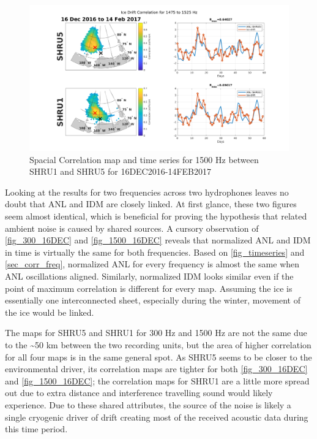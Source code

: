\begin{figure}[p]
\centering
\includegraphics[scale=0.35]{Figures/1500_spatial_corr_20161216-20170214_1475_1525.png}
\caption{Spacial Correlation map and time series for 1500 Hz between SHRU1 and SHRU5 for 16DEC2016-14FEB2017}
\label{fig_1500_16DEC}
\end{figure} 

Looking at the results for two frequencies across two hydrophones leaves no doubt that ANL and IDM are closely linked. At first glance, these two figures seem almost identical, which is beneficial for proving the hypothesis that related ambient noise is caused by shared sources. A cursory observation of \autoref{fig_300_16DEC} and \autoref{fig_1500_16DEC} reveals that normalized ANL and IDM in time is virtually the same for both frequencies. Based on \autoref{fig_timeseries} and \autoref{sec_corr_freq}, normalized ANL for every frequency is almost the same when ANL oscillations aligned. Similarly, normalized IDM looks similar even if the point of maximum correlation is different for every map. Assuming the ice is essentially one interconnected sheet, especially during the winter, movement of the ice would be linked.  


The maps for SHRU5 and SHRU1 for 300 Hz and 1500 Hz are not the same due to the \textasciitilde 50 km between the two recording units, but the area of higher correlation for all four maps is in the same general spot. As SHRU5 seems to be closer to the environmental driver, its correlation maps are tighter for both \autoref{fig_300_16DEC} and \autoref{fig_1500_16DEC}; the correlation maps for SHRU1 are a little more spread out due to extra distance and interference travelling sound would likely experience. Due to these shared attributes, the source of the noise is likely a single cryogenic driver of drift creating most of the received acoustic data during this time period. 

